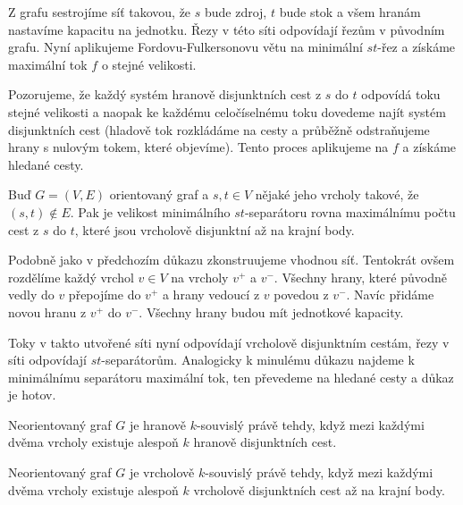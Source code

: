 \begin{t_proof}
  Z grafu sestrojíme síť takovou, že $s$ bude zdroj, $t$ bude stok a všem hranám nastavíme kapacitu na jednotku. Řezy v této síti odpovídají řezům v původním grafu. Nyní aplikujeme Fordovu-Fulkersonovu větu na minimální $st$-řez a získáme maximální tok $f$ o stejné velikosti.
  
  Pozorujeme, že každý systém hranově disjunktních cest z $s$ do $t$ odpovídá toku stejné velikosti a naopak ke každému celočíselnému toku dovedeme najít systém disjunktních cest (hladově tok rozkládáme na cesty a průběžně odstraňujeme hrany s nulovým tokem, které objevíme). Tento proces aplikujeme na $f$ a získáme hledané cesty.
\end{t_proof}

\begin{t_theorem}
  Buď $G=(V,E)$ orientovaný graf a $s, t\in V$ nějaké jeho vrcholy takové, že $(s,t)\notin E$. Pak je velikost minimálního $st$-separátoru rovna maximálnímu počtu cest z $s$ do $t$, které jsou vrcholově disjunktní až na krajní body.
\end{t_theorem}

\begin{t_proof}
  Podobně jako v předchozím důkazu zkonstruujeme vhodnou síť. Tentokrát ovšem rozdělíme každý vrchol $v\in V$ na vrcholy $v^+$ a $v^-$. Všechny hrany, které původně vedly do $v$ přepojíme do $v^+$ a hrany vedoucí z $v$ povedou z $v^-$. Navíc přidáme novou hranu z $v^+$ do $v^-$. Všechny hrany budou mít jednotkové kapacity.
  
  Toky v takto utvořené síti nyní odpovídají vrcholově disjunktním cestám, řezy v síti odpovídají $st$-separátorům. Analogicky k minulému důkazu najdeme k minimálnímu separátoru maximální tok, ten převedeme na hledané cesty a důkaz je hotov.
\end{t_proof}

\begin{t_corollary}
  Neorientovaný graf $G$ je hranově $k$-souvislý právě tehdy, když mezi každými dvěma vrcholy existuje alespoň $k$ hranově disjunktních cest.
\end{t_corollary}

\begin{t_corollary}
  Neorientovaný graf $G$ je vrcholově $k$-souvislý právě tehdy, když mezi každými dvěma vrcholy existuje alespoň $k$ vrcholově disjunktních cest až na krajní body.
\end{t_corollary}

